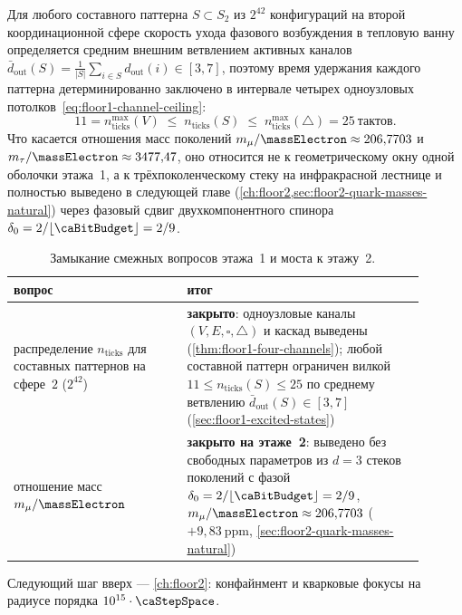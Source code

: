 Для любого составного паттерна $S\subset S_2$ из $2^{42}$ конфигураций на второй координационной сфере скорость ухода фазового возбуждения в тепловую ванну определяется средним внешним ветвлением активных каналов $\bar d_{\mathrm{out}}(S) = \frac{1}{|S|}\sum_{i\in S} d_{\mathrm{out}}(i) \in [3, 7]$, поэтому время удержания каждого паттерна детерминированно заключено в интервале четырех одноузловых потолков~\eqref{eq:floor1-channel-ceiling}:
\[
  11 = n_{\mathrm{ticks}}^{\max}(V) \;\le\; n_{\mathrm{ticks}}(S) \;\le\; n_{\mathrm{ticks}}^{\max}(\triangle) = 25\ \mathrm{тактов}.
\]
Что касается отношения масс поколений $m_\mu/\massElectron \approx 206{,}7703$ и $m_\tau/\massElectron \approx 3477{,}47$, оно относится не к геометрическому окну одной оболочки этажа~1, а к трёхпоколенческому стеку на инфракрасной лестнице и полностью выведено в следующей главе (\cref{ch:floor2,sec:floor2-quark-masses-natural}) через фазовый сдвиг двухкомпонентного спинора $\delta_0 = 2/\lfloor\caBitBudget\rfloor = 2/9$.

\begin{table}[htbp]
  \centering
  \caption{Замыкание смежных вопросов этажа~1 и моста к этажу~2.}
  \label{tab:floor1-open}
  \begin{tabular}{@{}p{0.38\linewidth}p{0.52\linewidth}@{}}
    \toprule
    вопрос & итог \\
    \midrule
    распределение $n_{\mathrm{ticks}}$ для составных паттернов на сфере~$2$ ($2^{42}$) &
    \textbf{закрыто}: одноузловые каналы $(V,E,\square,\triangle)$ и каскад выведены (\cref{thm:floor1-four-channels}); любой составной паттерн ограничен вилкой $11\le n_{\mathrm{ticks}}(S)\le 25$ по среднему ветвлению $\bar d_{\mathrm{out}}(S)\in[3,7]$ (\cref{sec:floor1-excited-states}) \\
    отношение масс $m_\mu/\massElectron$ &
    \textbf{закрыто на этаже~2}: выведено без свободных параметров из $d=3$ стеков поколений с фазой $\delta_0=2/\lfloor\caBitBudget\rfloor=2/9$, $m_\mu/\massElectron\approx 206{,}7703$ ($+9{,}83\ \mathrm{ppm}$, \cref{sec:floor2-quark-masses-natural}) \\
    \bottomrule
  \end{tabular}
\end{table}

Следующий шаг вверх --- \cref{ch:floor2}: конфайнмент и кварковые фокусы
на радиусе порядка $10^{15}\cdot\caStepSpace$.
